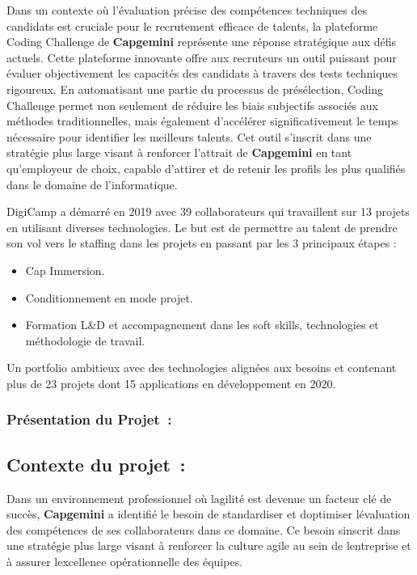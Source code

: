 \documentclass[12pt,a4paper,twoside]{report}
\begin{document}
Dans
un contexte où l'évaluation précise des compétences techniques des
candidats est cruciale pour le recrutement efficace de talents, la
plateforme Coding Challenge de \textbf{Capgemini} représente une réponse
stratégique aux défis actuels. Cette plateforme innovante offre aux
recruteurs un outil puissant pour évaluer objectivement les capacités
des candidats à travers des tests techniques rigoureux. En automatisant
une partie du processus de présélection, Coding Challenge permet non
seulement de réduire les biais subjectifs associés aux méthodes
traditionnelles, mais également d'accélérer significativement le temps
nécessaire pour identifier les meilleurs talents. Cet outil s'inscrit
dans une stratégie plus large visant à renforcer l'attrait de
\textbf{Capgemini} en tant qu'employeur de choix, capable d'attirer et
de retenir les profils les plus qualifiés dans le domaine de
l'informatique.

DigiCamp a démarré en 2019 avec 39 collaborateurs qui travaillent sur 13
projets en utilisant diverses technologies. Le but est de permettre au
talent de prendre son vol vers le staffing dans les projets en passant
par les 3 principaux étapes :

\begin{itemize}
\item
  Cap Immersion.
\item
  Conditionnement en mode projet.
\item
  Formation L\&D et accompagnement dans les soft skills, technologies et
  méthodologie de travail.
\end{itemize}

Un portfolio ambitieux avec des technologies alignées aux besoins et
contenant plus de 23 projets dont 15 applications en développement en
2020.

\hypertarget{pruxe9sentation-du-projet}{%
\subsubsection{Présentation du
Projet~:}\label{pruxe9sentation-du-projet}}

\hypertarget{contexte-du-projet}{%
\subsection{Contexte du projet~:}\label{contexte-du-projet}}

Dans un environnement professionnel où l\textquotesingle agilité est
devenue un facteur clé de succès, \textbf{Capgemini} a identifié le
besoin de standardiser et d\textquotesingle optimiser
l\textquotesingle évaluation des compétences de ses collaborateurs dans
ce domaine. Ce besoin s\textquotesingle inscrit dans une stratégie plus
large visant à renforcer la culture agile au sein de
l\textquotesingle entreprise et à assurer l\textquotesingle excellence
opérationnelle des équipes.
\end{document}
